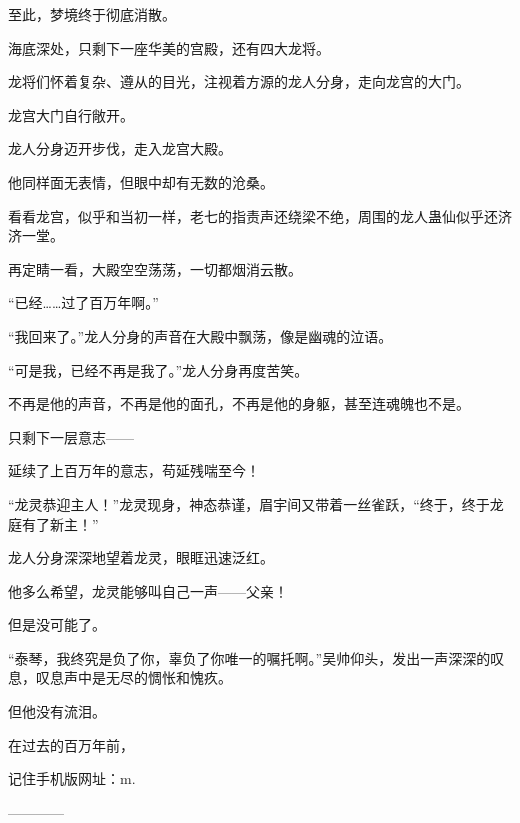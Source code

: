\begin{this_body}
至此，梦境终于彻底消散。

海底深处，只剩下一座华美的宫殿，还有四大龙将。

龙将们怀着复杂、遵从的目光，注视着方源的龙人分身，走向龙宫的大门。

龙宫大门自行敞开。

龙人分身迈开步伐，走入龙宫大殿。

他同样面无表情，但眼中却有无数的沧桑。

看看龙宫，似乎和当初一样，老七的指责声还绕梁不绝，周围的龙人蛊仙似乎还济济一堂。

再定睛一看，大殿空空荡荡，一切都烟消云散。

“已经……过了百万年啊。”

“我回来了。”龙人分身的声音在大殿中飘荡，像是幽魂的泣语。

“可是我，已经不再是我了。”龙人分身再度苦笑。

不再是他的声音，不再是他的面孔，不再是他的身躯，甚至连魂魄也不是。

只剩下一层意志——

延续了上百万年的意志，苟延残喘至今！

“龙灵恭迎主人！”龙灵现身，神态恭谨，眉宇间又带着一丝雀跃，“终于，终于龙庭有了新主！”

龙人分身深深地望着龙灵，眼眶迅速泛红。

他多么希望，龙灵能够叫自己一声——父亲！

但是没可能了。

“泰琴，我终究是负了你，辜负了你唯一的嘱托啊。”吴帅仰头，发出一声深深的叹息，叹息声中是无尽的惆怅和愧疚。

但他没有流泪。

在过去的百万年前，

记住手机版网址：m.

------------

\end{this_body}

